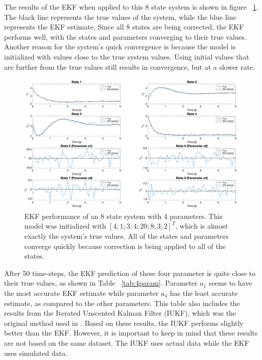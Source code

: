 \noindent The results of the EKF when applied to this 8 state system is shown in figure ~\ref{fig:4param}. The black line represents the true values of the system, while the blue line represents the EKF estimate. Since all 8 states are being corrected, the EKF performs well, with the states and parameters converging to their true values. Another reason for the system's quick convergence is because the model is initialized with values close to the true system values. Using initial values that are further from the true values still results in convergence, but at a slower rate. \\

\begin{figure}[ht]
    \centering
    \includegraphics[scale = 0.3]{EKF_4param.png}
    \caption{EKF performance of an 8 state system with 4 parameters. This model was initialized with $[4;1;3;4;20;8;3;2]^T$, which is almost exactly the system's true values. All of the states and parameters converge quickly because correction is being applied to all of the states.}
    \label{fig:4param}
\end{figure}

\newpage


\noindent After 50 time-steps, the EKF prediction of these four parameter is quite close to their true values, as shown in Table ~\ref{tab:4param}. Parameter $a_1$ seems to have the most accurate EKF estimate while parameter $a_4$ has the least accurate estimate, as compared to the other parameters. This table also includes the results from the Iterated Unscented Kalman Filter (IUKF), which was the original method used in \cite{article5}. Based on these results, the IUKF performs slightly better than the EKF. However, it is important to keep in mind that these results are not based on the same dataset. The IUKF uses actual data while the EKF uses simulated data.

